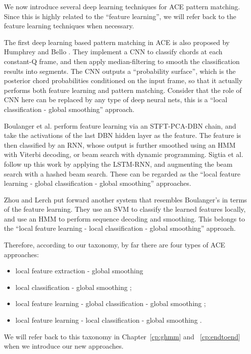 We now introduce several deep learning techniques for ACE pattern matching. Since this is highly related to the ``feature learning'', we will refer back to the feature learning techniques when necessary.

The first deep learning based pattern matching in ACE is also proposed by Humphrey and Bello \cite{humphrey2012rethinking}. They implement a CNN to classify chords at each constant-Q frame, and then apply median-filtering to smooth the classification results into segments. The CNN outputs a ``probability surface'', which is the posterior chord probabilities conditioned on the input frame, so that it actually performs both feature learning and pattern matching. Consider that the role of CNN here can be replaced by any type of deep neural nets, this is a ``local classification - global smoothing'' approach.

Boulanger et al. \cite{boulanger2013audio} perform feature learning via an STFT-PCA-DBN chain, and take the activations of the last DBN hidden layer as the feature. The feature is then classified by an RNN, whose output is further smoothed using an HMM with Viterbi decoding, or beam search with dynamic programming. Sigtia et al. \cite{sigtia2015audio} follow up this work by applying the LSTM-RNN, and augmenting the beam search with a hashed beam search. These can be regarded as the ``local feature learning - global classification - global smoothing'' approaches.

Zhou and Lerch \cite{zhou2015chord} put forward another system that resembles Boulanger's in terms of the feature learning. They use an SVM to classify the learned features locally, and use an HMM to perform sequence decoding and smoothing. This belongs to the ``local feature learning - local classification - global smoothing'' approach.

Therefore, according to our taxonomy, by far there are four types of ACE approaches:
\begin{itemize}
	\item local feature extraction - global smoothing \cite{fujishima1999realtime,sheh2003chord}
	\item local classification - global smoothing \cite{humphrey2012rethinking};
	\item local feature learning - global classification - global smoothing \cite{boulanger2013audio,sigtia2015audio};
	\item local feature learning - local classification - global smoothing \cite{zhou2015chord}.
\end{itemize}
We will refer back to this taxonomy in Chapter~\ref{cp:ghmm} and ~\ref{cp:endtoend} when we introduce our new approaches.

